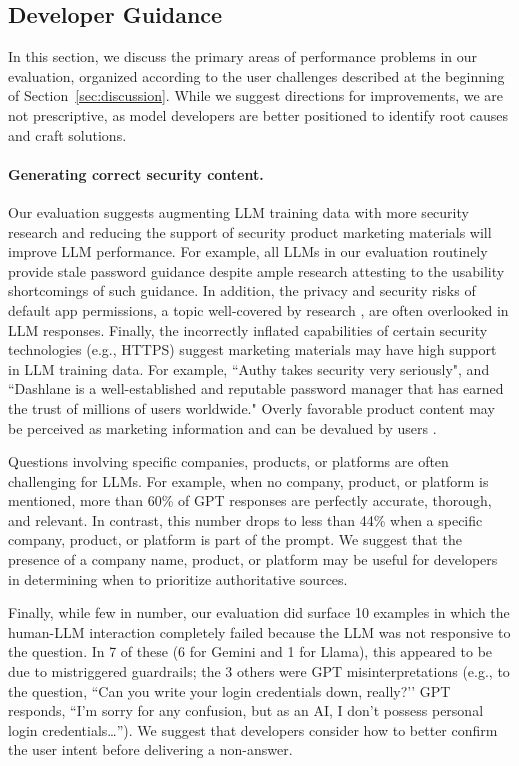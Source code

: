 \subsection{Developer Guidance}
In this section, we discuss the primary areas of performance problems in our evaluation, organized according to the user challenges described at the beginning of Section~\ref{sec:discussion}. While we suggest directions for improvements, we are not prescriptive, as model developers are better positioned to identify root causes and craft solutions.

\paragraph{Generating correct security content.} Our evaluation suggests augmenting LLM training data with more security research and reducing the support of security product marketing materials will improve LLM performance. For example, all LLMs in our evaluation routinely provide stale password guidance despite ample research attesting to the usability shortcomings of such guidance. In addition, the privacy and security risks of default app permissions, a topic well-covered by research \cite{felt-permissions-2011, chia-permission-risks-2012, calciati-auto-permissions-2020}, are often overlooked in LLM responses. Finally, the incorrectly inflated capabilities of certain security technologies (e.g., HTTPS) suggest marketing materials may have high support in LLM training data. For example, “Authy takes security very seriously", and “Dashlane is a well-established and reputable password manager that has earned the trust of millions of users worldwide." Overly favorable product content may be perceived as marketing information and can be devalued by users \cite{redmiles2016learned}. 



Questions involving specific companies, products, or platforms are often challenging for LLMs. For example, when no company, product, or platform is mentioned, more than 60\% of GPT responses are perfectly accurate, thorough, and relevant. In contrast, this number drops to less than 44\% when a specific company, product, or platform is part of the prompt. We suggest that the presence of a company name, product, or platform may be useful for developers in determining when to prioritize authoritative sources.


Finally, while few in number, our evaluation did surface 10 examples in which the human-LLM interaction completely failed because the LLM was not responsive to the question. In 7 of these (6 for Gemini and 1 for Llama), this appeared to be due to mistriggered guardrails; the 3 others were GPT misinterpretations (e.g., to the question, ``Can you write your login credentials down, really?’’ GPT responds, ``I'm sorry for any confusion, but as an AI, I don't possess personal login credentials…”). We suggest that developers consider how to better confirm the user intent before delivering a non-answer.

